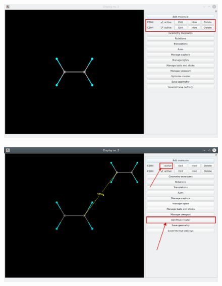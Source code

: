 \documentclass[a4paper,10pt]{article}
\begin{document}
\begin{minipage}{.5\linewidth}
\begin{figure}[H]
\caption{\label{fig:49}}
\begin{center}
\includegraphics[width=0.95\linewidth]{damqt_QS_fig49_b.png}
\end{center}
\end{figure} 
\end{minipage}
\begin{minipage}{.5\linewidth}
\begin{figure}[H]
\caption{\label{fig:50}}
\begin{center}
\includegraphics[width=0.95\linewidth]{damqt_QS_fig50_b.png}
\end{center}
\end{figure} 
\end{minipage}
\end{document}
